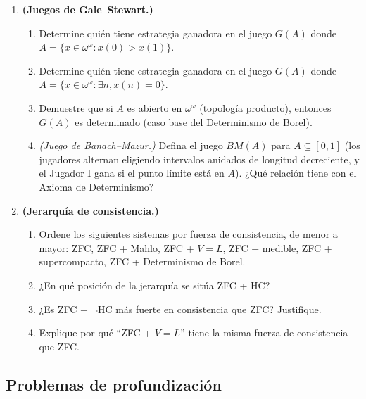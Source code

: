 \begin{enumerate}[leftmargin=2em, label=\textbf{P\arabic*.}]
  \item \textbf{(Juegos de Gale--Stewart.)}
  \begin{enumerate}[label=(\alph*)]
    \item Determine quién tiene estrategia ganadora en el juego $G(A)$ donde $A = \{x \in \omega^\omega : x(0) > x(1)\}$.
    \item Determine quién tiene estrategia ganadora en el juego $G(A)$ donde $A = \{x \in \omega^\omega : \exists n, x(n) = 0\}$.
    \item Demuestre que si $A$ es abierto en $\omega^\omega$ (topología producto), entonces $G(A)$ es determinado (caso base del Determinismo de Borel).
    \item \textit{(Juego de Banach--Mazur.)} Defina el juego $BM(A)$ para $A \subseteq [0,1]$ (los jugadores alternan eligiendo intervalos anidados de longitud decreciente, y el Jugador I gana si el punto límite está en $A$). ¿Qué relación tiene con el Axioma de Determinismo?
  \end{enumerate}

  \item \textbf{(Jerarquía de consistencia.)}
  \begin{enumerate}[label=(\alph*)]
    \item Ordene los siguientes sistemas por fuerza de consistencia, de menor a mayor: ZFC, ZFC + Mahlo, ZFC + $V = L$, ZFC + medible, ZFC + supercompacto, ZFC + Determinismo de Borel.
    \item ¿En qué posición de la jerarquía se sitúa ZFC + HC?
    \item ¿Es ZFC + $\neg$HC más fuerte en consistencia que ZFC? Justifique.
    \item Explique por qué ``ZFC + $V = L$'' tiene la misma fuerza de consistencia que ZFC.
  \end{enumerate}

\end{enumerate}

\subsection*{Problemas de profundización}

